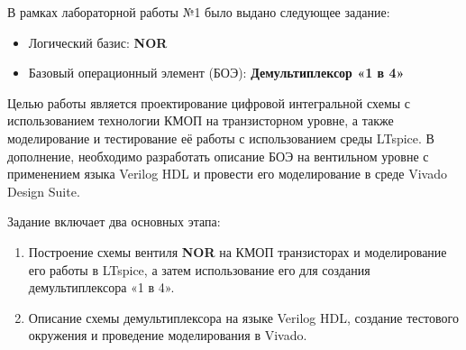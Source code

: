 В рамках лабораторной работы №1 было выдано следующее задание:

\begin{itemize}
	\item Логический базис: \textbf{NOR}
	\item Базовый операционный элемент (БОЭ): \textbf{Демультиплексор «1 в 4»}
\end{itemize}

Целью работы является проектирование цифровой интегральной схемы с использованием технологии КМОП на транзисторном уровне, а также моделирование и тестирование её работы с использованием среды LTspice. В дополнение, необходимо разработать описание БОЭ на вентильном уровне с применением языка Verilog HDL и провести его моделирование в среде Vivado Design Suite.

Задание включает два основных этапа:
\begin{enumerate}
	\item Построение схемы вентиля \textbf{NOR} на КМОП транзисторах и моделирование его работы в LTspice, а затем использование его для создания демультиплексора «1 в 4».
	\item Описание схемы демультиплексора на языке Verilog HDL, создание тестового окружения и проведение моделирования в Vivado.
\end{enumerate}

